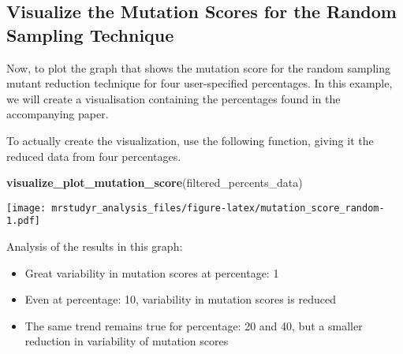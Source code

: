 \documentclass[]{article}
\newenvironment{Shaded}{}{}
\newcommand{\KeywordTok}[1]{\textcolor[rgb]{0.00,0.44,0.13}{\textbf{{#1}}}}
\newcommand{\DecValTok}[1]{\textcolor[rgb]{0.25,0.63,0.44}{{#1}}}
\newcommand{\StringTok}[1]{\textcolor[rgb]{0.25,0.44,0.63}{{#1}}}
\newcommand{\NormalTok}[1]{{#1}}
\providecommand{\tightlist}{%
  \setlength{\itemsep}{0pt}\setlength{\parskip}{0pt}}
\begin{document}
\subsection{Visualize the Mutation Scores for the Random Sampling
Technique}\label{visualize-the-mutation-scores-for-the-random-sampling-technique}

Now, to plot the graph that shows the mutation score for the random
sampling mutant reduction technique for four user-specified percentages.
In this example, we will create a visualisation containing the
percentages found in the accompanying paper.

\begin{Shaded}
\end{Shaded}

To actually create the visualization, use the following function, giving
it the reduced data from four percentages.

\begin{Shaded}
\begin{Highlighting}[]
\KeywordTok{visualize_plot_mutation_score}\NormalTok{(filtered_percents_data)}
\end{Highlighting}
\end{Shaded}

\texttt{[image: mrstudyr\_analysis\_files/figure-latex/mutation\_score\_random-1.pdf]}

Analysis of the results in this graph:

\begin{itemize}
\tightlist
\item
  Great variability in mutation scores at percentage: 1
\item
  Even at percentage: 10, variability in mutation scores is reduced
\item
  The same trend remains true for percentage: 20 and 40, but a smaller
  reduction in variability of mutation scores
\end{itemize}
\end{document}
